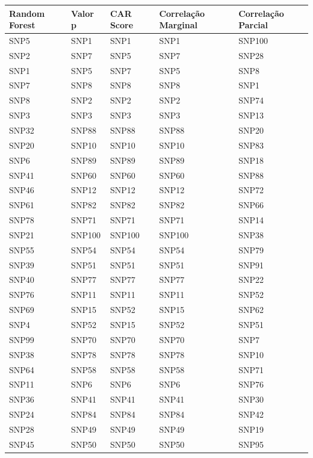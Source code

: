 \begin{table}[ht]
\centering
\begin{tabular}{lllll}
  \hline
Random Forest & Valor p & CAR Score & Correlação Marginal & Correlação Parcial \\ 
  \hline
SNP5 & SNP1 & SNP1 & SNP1 & SNP100 \\ 
  SNP2 & SNP7 & SNP5 & SNP7 & SNP28 \\ 
  SNP1 & SNP5 & SNP7 & SNP5 & SNP8 \\ 
  SNP7 & SNP8 & SNP8 & SNP8 & SNP1 \\ 
  SNP8 & SNP2 & SNP2 & SNP2 & SNP74 \\ 
  SNP3 & SNP3 & SNP3 & SNP3 & SNP13 \\ 
  SNP32 & SNP88 & SNP88 & SNP88 & SNP20 \\ 
  SNP20 & SNP10 & SNP10 & SNP10 & SNP83 \\ 
  SNP6 & SNP89 & SNP89 & SNP89 & SNP18 \\ 
  SNP41 & SNP60 & SNP60 & SNP60 & SNP88 \\ 
  SNP46 & SNP12 & SNP12 & SNP12 & SNP72 \\ 
  SNP61 & SNP82 & SNP82 & SNP82 & SNP66 \\ 
  SNP78 & SNP71 & SNP71 & SNP71 & SNP14 \\ 
  SNP21 & SNP100 & SNP100 & SNP100 & SNP38 \\ 
  SNP55 & SNP54 & SNP54 & SNP54 & SNP79 \\ 
  SNP39 & SNP51 & SNP51 & SNP51 & SNP91 \\ 
  SNP40 & SNP77 & SNP77 & SNP77 & SNP22 \\ 
  SNP76 & SNP11 & SNP11 & SNP11 & SNP52 \\ 
  SNP69 & SNP15 & SNP52 & SNP15 & SNP62 \\ 
  SNP4 & SNP52 & SNP15 & SNP52 & SNP51 \\ 
  SNP99 & SNP70 & SNP70 & SNP70 & SNP7 \\ 
  SNP38 & SNP78 & SNP78 & SNP78 & SNP10 \\ 
  SNP64 & SNP58 & SNP58 & SNP58 & SNP71 \\ 
  SNP11 & SNP6 & SNP6 & SNP6 & SNP76 \\ 
  SNP36 & SNP41 & SNP41 & SNP41 & SNP30 \\ 
  SNP24 & SNP84 & SNP84 & SNP84 & SNP42 \\ 
  SNP28 & SNP49 & SNP49 & SNP49 & SNP19 \\ 
  SNP45 & SNP50 & SNP50 & SNP50 & SNP95 \\ 

\end{tabular}
\end{table}
